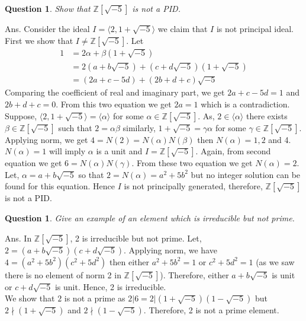 \documentclass[11pt]{amsart}
\newtheorem{qns}[theorem]{Question}
\newtheorem*{qns*}{Question}
\newcommand{\ZZ}{\mathbb Z}
\newcommand{\gen}[1]{\langle#1\rangle}
\begin{document}
\begin{qns*}
Show that ${\ZZ}[\sqrt{-5}]$ is not a PID.
\end{qns*}
Ans. Consider the ideal $I=\gen{2,1+\sqrt{-5}}$ we claim that $I$ is not principal ideal. First we show that $I\neq {\ZZ}[\sqrt{-5}]$. Let \begin{align*}
1&=2\alpha+\beta(1+\sqrt{-5})\\
&=2(a+b\sqrt{-5})+(c+d\sqrt{-5})(1+\sqrt{-5})\\
&=(2a+c-5d)+(2b+d+c)\sqrt{-5}
\end{align*}
Comparing the coefficient of real and imaginary part, we get $2a+c-5d=1$ and $2b+d+c=0$. From this two equation we get $2a=1$ which is a contradiction.\\
Suppose, $\gen{2,1+\sqrt{-5}}=\gen{\alpha}$ for some $\alpha\in {\ZZ}[\sqrt{-5}]$. As, $2\in \gen{\alpha}$ there exists $\beta\in {\ZZ}[\sqrt{-5}]$ such that $2=\alpha\beta$ similarly,
$1+\sqrt{-5}=\gamma\alpha$ for some $\gamma\in {\ZZ}[\sqrt{-5}].$ Applying norm, we get $4=N(2)=N(\alpha)N(\beta)$ then $N(\alpha)=1,2$ and 4. $N(\alpha)= 1$ will imply $\alpha$ is a unit and $I={\ZZ}[\sqrt{-5}].$ Again, from second equation we get $6=N(\alpha)N(\gamma)$. From these two equation we get $N(\alpha)=2$. Let, $\alpha=a+b\sqrt{-5}$ so that $2=N(\alpha)=a^2+5b^2$ but no integer solution can be found for this equation. Hence $I$ is not principally generated, therefore, ${\ZZ}[\sqrt{-5}]$ is not a PID.
\begin{qns}
Give an example of an element which is irreducible but not prime.
\end{qns}
Ans. In ${\ZZ}[\sqrt{-5}]$, 2 is irreducible but not prime. Let, $2=(a+b\sqrt{-5})(c+d\sqrt{-5})$. Applying norm, we have $4=(a^2+5b^2)(c^2+5d^2)$ then either $a^2+5b^2=1$ or $c^2+5d^2=1$ (as we saw there is no element of norm 2 in ${\ZZ}[\sqrt{-5}]$). Therefore, either $a+b\sqrt{-5}$ is unit or $c+d\sqrt{-5}$ is unit. Hence, 2 is irreducible.\\
We show that $2$ is not a prime as $2|6=2|(1+\sqrt{-5})(1-\sqrt{-5})$ but $2\nmid (1+\sqrt{-5})$ and $2\nmid (1-\sqrt{-5})$. Therefore, 2 is not a prime element.
\end{document}
